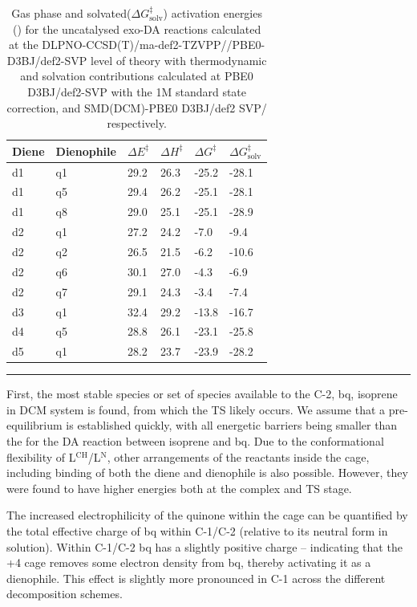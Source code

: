 \documentclass[../../main.tex]{subfiles}
\begin{document}
\begin{table}[h!]
	\def\arraystretch{1.7}
	\begin{tabularx}{\textwidth}{YYYYYY}
		\hline
		Diene	&Dienophile	&$\Delta E^\ddagger$ &$\Delta H^\ddagger$&	$\Delta G^\ddagger$	&$\Delta G^\ddagger_\text{solv}$ \\
		\hline
		d1&	q1	&29.2&	26.3&	-25.2&	-28.1
\\
		d1	&q5	&29.4&	26.2&	-25.1&	-28.1
\\
		d1&	q8	&29.0&	25.1&	-25.1&	-28.9\\
		d2&	q1	&27.2&	24.2&	-7.0&	-9.4
\\
		d2&	q2	&26.5&	21.5&	-6.2&	-10.6
\\
		d2&	q6	&30.1	&27.0&	-4.3&	-6.9
\\
		d2&	q7	&29.1&	24.3&	-3.4&	-7.4
\\
		d3&	q1	&32.4&	29.2&	-13.8&	-16.7
\\
		d4&	q5	&28.8&	26.1&	-23.1&	-25.8
\\
		d5&	q1	&28.2	&23.7&	-23.9&	-28.2\\
	\end{tabularx}
	\hrule
	\vspace{0.2cm}
	\caption{Gas phase and solvated($\Delta G^\ddagger_\text{solv}$) activation energies (\kcal) for the uncatalysed exo-DA reactions calculated at the DLPNO-CCSD(T)/ma-def2-TZVPP//PBE0-D3BJ/def2-SVP level of theory with thermodynamic and solvation contributions calculated at PBE0 D3BJ/def2-SVP with the 1M standard state correction, and SMD(DCM)-PBE0 D3BJ/def2 SVP/ respectively.}
	\label{table::si_da_15}
\end{table}


\clearpage   %


First, the most stable species or set of species available to the C-2, bq, isoprene in DCM system is found, from which the TS likely occurs. We assume that a pre-equilibrium is established quickly, with all energetic barriers being smaller than the for the DA reaction between isoprene and bq. Due to the conformational flexibility of L${}^\text{CH}$/L${}^\text{N}$, other arrangements of the reactants inside the cage, including binding of both the diene and dienophile is also possible. However, they were found to have higher energies both at the complex and TS stage. 

The increased electrophilicity of the quinone within the cage can be quantified by the total effective charge of bq within C-1/C-2 (relative to its neutral form in solution). Within C-1/C-2 bq has a slightly positive charge – indicating that the +4 cage removes some electron density from bq, thereby activating it as a dienophile. This effect is slightly more pronounced in C-1 across the different decomposition schemes.
\end{document}
